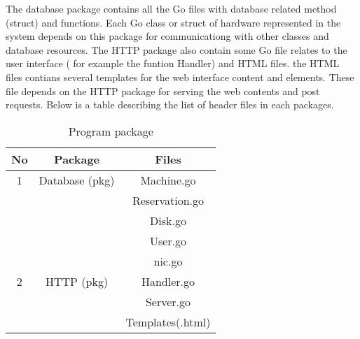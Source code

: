 The database package contains all the Go files with database related method (struct) and functions. Each Go class or struct of hardware represented in the system depends on this package for communicationg with other classes and database resources. The HTTP package also contain some Go file relates to the user interface ( for example the funtion Handler) and HTML files. the HTML files contians several templates for the web interface content and elements. These file depends on the HTTP package for serving the web contents and post requests. Below is a table describing the list of header files in each packages.
\begin{table}[h!]
  \centering
  \label{tab:table1}
  \begin{tabular}{ccc}
    \toprule
    No & Package & Files\\
   \midrule
    1 &Database (pkg)& Machine.go\\
       &&Reservation.go\\
      &&Disk.go\\
      &&User.go\\
      &&nic.go\\
    \midrule
    2 &HTTP (pkg)& Handler.go\\
    &&Server.go\\
    &&Templates(.html)\\
    \bottomrule
  \end{tabular}
  \caption{Program package}
\end{table}

